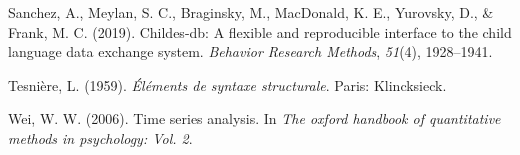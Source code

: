 \documentclass[10pt, letterpaper]{article}
\begin{document}
\leavevmode\hypertarget{ref-sanchez2019childes}{}%
Sanchez, A., Meylan, S. C., Braginsky, M., MacDonald, K. E., Yurovsky,
D., \& Frank, M. C. (2019). Childes-db: A flexible and reproducible
interface to the child language data exchange system. \emph{Behavior
Research Methods}, \emph{51}(4), 1928--1941.

\leavevmode\hypertarget{ref-dg}{}%
Tesnière, L. (1959). \emph{Éléments de syntaxe structurale}. Paris:
Klincksieck.

\leavevmode\hypertarget{ref-wei2006time}{}%
Wei, W. W. (2006). Time series analysis. In \emph{The oxford handbook of
quantitative methods in psychology: Vol. 2}.


\end{document}

